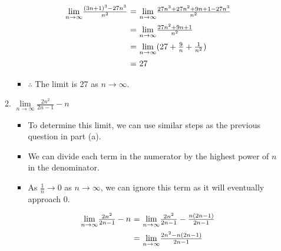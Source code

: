 \documentclass[12pt]{report}
\begin{document}
\begin{enumerate}[leftmargin=\labelsep]
\begin{enumerate}
\begin{tcolorbox}
                    \begin{equation*}
                        \begin{array}{r@{~=~}l}
                            {\lim \limits_{{n\rightarrow \infty}}} \frac{(3n+1)^3-27n^3}{n^2} & {\lim \limits_{{n\rightarrow \infty}}} \frac{27n^3+27n^2+9n+1-27n^3}{n^2} \\ [2ex]
                            & {\lim \limits_{{n\rightarrow \infty}}} \frac{27n^2+9n+1}{n^2} \\ [2ex]
                            & {\lim \limits_{{n\rightarrow \infty}}} (27+\frac{9}{n}+\frac{1}{n^2}) \\ [2ex]
                            & 27
                        \end{array}
                    \end{equation*}
                    \begin{itemize}[label={}]
                        \item $\therefore$ The limit is 27 as $n \rightarrow \infty$.
                    \end{itemize}
                \end{tcolorbox}
\newpage
            \item $\lim \limits_{n\rightarrow \infty} \frac{2n^2}{2n-1}-n$
                \begin{tcolorbox}
                    \begin{itemize}[label={}]
                        \item To determine this limit, we can use similar steps as the previous question in part (a).
                        \item We can divide each term in the numerator by the highest power of $n$ in the denominator.
                        \item As $\frac{1}{n} \rightarrow 0$ as $n \rightarrow \infty$, we can ignore this term as it will eventually approach 0.
                    \end{itemize}
                    \begin{equation*}
                        \begin{array}{r@{~=~}l}
                            {\lim \limits_{{n\rightarrow \infty}}} \frac{2n^2}{2n-1}-n & {\lim \limits_{{n\rightarrow \infty}}} \frac{2n^2}{2n-1}-\frac{n(2n-1)}{2n-1} \\ [2ex]
                            & {\lim \limits_{{n\rightarrow \infty}}} \frac{2n^2-n(2n-1)}{2n-1} \\ [2ex]

\end{array}
\end{equation*}
\end{tcolorbox}
\end{enumerate}
\end{enumerate}
\end{document}
